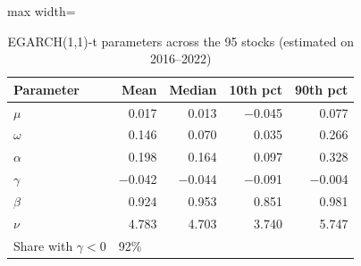 \begin{table}[H]
\centering
\caption{EGARCH(1,1)-t parameters across the 95 stocks (estimated on 2016--2022)}
\label{tab:egarch}
\small
\begin{adjustbox}{max width=\textwidth}
\begin{tabular}{lrrrr}
\toprule
Parameter & Mean & Median & 10th pct & 90th pct \\
\midrule
$\mu$ & 0.017 & 0.013 & $-$0.045 & 0.077 \\
$\omega$ & 0.146 & 0.070 & 0.035 & 0.266 \\
$\alpha$ & 0.198 & 0.164 & 0.097 & 0.328 \\
$\gamma$ & $-$0.042 & $-$0.044 & $-$0.091 & $-$0.004 \\
$\beta$ & 0.924 & 0.953 & 0.851 & 0.981 \\
$\nu$ & 4.783 & 4.703 & 3.740 & 5.747 \\
Share with $\gamma<0$ & \multicolumn{4}{l}{92\%} \\
\bottomrule
\end{tabular}
\end{adjustbox}
\end{table}
